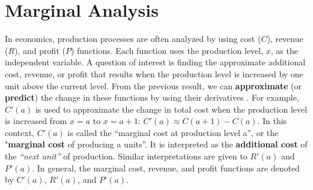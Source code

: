 \section*{Marginal Analysis}
In economics, production processes are often analyzed by using cost ($C$), revenue ($R$), and profit ($P$) functions.  Each function uses the production level, $x$, as the independent variable.  A question of interest is finding the approximate additional cost, revenue, or profit that results when the production level is increased by one unit above the current level.  From the previous result, we can \textbf{approximate} (or \textbf{predict}) the change in these functions by using their derivatives .  For example, $C'(a)$ is used to approximate the change in total cost when the production level is increased from $x=a$ to $x=a+1$: $C'(a)\approx C(a+1)-C(a)$.  In this context, $C'(a)$ is called the “marginal cost at production level a”, or the "\textbf{marginal cost} of producing a units”.  It is interpreted as the \textbf{additional cost} of the \emph{“next unit”} of production.  Similar interpretations are given to $R'(a)$ and $P'(a)$.  In general, the marginal cost, revenue, and profit functions are denoted by $C'(a)$, $R'(a)$, and $P'(a)$.
